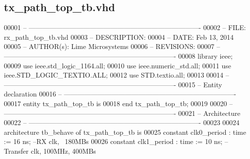\subsection{tx\+\_\+path\+\_\+top\+\_\+tb.\+vhd}
\label{tx__path__top__tb_8vhd_source}

\begin{DoxyCode}
00001 \textcolor{keyword}{-- ---------------------------------------------------------------------------- }
00002 \textcolor{keyword}{-- FILE:    rx\_path\_top\_tb.vhd}
00003 \textcolor{keyword}{-- DESCRIPTION: }
00004 \textcolor{keyword}{-- DATE:    Feb 13, 2014}
00005 \textcolor{keyword}{-- AUTHOR(s):   Lime Microsystems}
00006 \textcolor{keyword}{-- REVISIONS:}
00007 \textcolor{keyword}{-- ---------------------------------------------------------------------------- }
00008 \textcolor{vhdlkeyword}{library }\textcolor{keywordflow}{ieee};
00009 \textcolor{vhdlkeyword}{use }ieee.std\_logic\_1164.\textcolor{keywordflow}{all};
00010 \textcolor{vhdlkeyword}{use }ieee.numeric\_std.\textcolor{keywordflow}{all};
00011 \textcolor{vhdlkeyword}{use }ieee.STD\_LOGIC\_TEXTIO.\textcolor{keywordflow}{ALL};
00012 \textcolor{vhdlkeyword}{use }STD.textio.\textcolor{keywordflow}{all};
00013 
00014 \textcolor{keyword}{-- ----------------------------------------------------------------------------}
00015 \textcolor{keyword}{-- Entity declaration}
00016 \textcolor{keyword}{-- ----------------------------------------------------------------------------}
00017 \textcolor{keywordflow}{entity }tx_path_top_tb \textcolor{keywordflow}{is}
00018 \textcolor{keywordflow}{end} \textcolor{vhdlchar}{tx\_path\_top\_tb};
00019 
00020 \textcolor{keyword}{-- ----------------------------------------------------------------------------}
00021 \textcolor{keyword}{-- Architecture}
00022 \textcolor{keyword}{-- ----------------------------------------------------------------------------}
00023 
00024 \textcolor{keywordflow}{architecture} tb\_behave \textcolor{keywordflow}{of} tx_path_top_tb is
00025    \textcolor{keywordflow}{constant} \textcolor{vhdlchar}{clk0_period}    \textcolor{vhdlchar}{:} \textcolor{comment}{time} \textcolor{vhdlchar}{:=} \textcolor{vhdllogic}{}\textcolor{vhdllogic}{16} \textcolor{vhdlchar}{ns};\textcolor{keyword}{   --RX clk, ~180MBs}
00026    \textcolor{keywordflow}{constant} \textcolor{vhdlchar}{clk1_period}    \textcolor{vhdlchar}{:} \textcolor{comment}{time} \textcolor{vhdlchar}{:=} \textcolor{vhdllogic}{}\textcolor{vhdllogic}{10} \textcolor{vhdlchar}{ns};\textcolor{keyword}{     --Transfer clk, 100MHz, 400MBs }

\end{DoxyCode}
